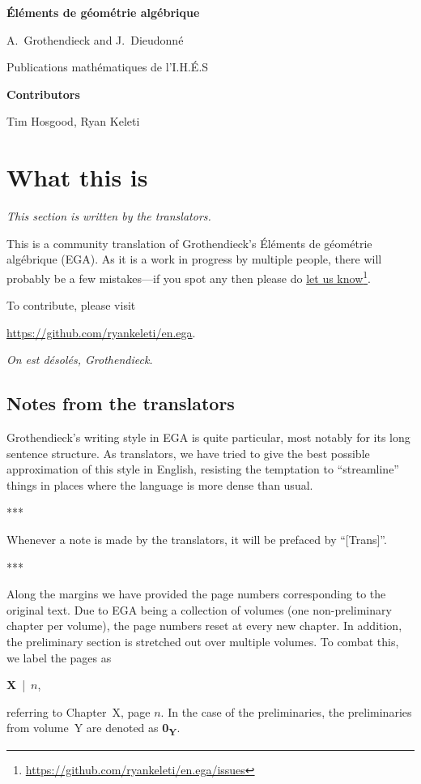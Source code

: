 \documentclass[openany,oneside]{amsbook}
\theoremstyle{ega-env-style}
\theoremstyle{ega-thm-env-style}
\theoremstyle{ega-defn-env-style}
\def\sectionbreak{\begin{center}***\end{center}}
\begin{document}
\begin{titlepage}
\pagestyle{empty}
\setcounter{page}{1}
\centerline{\LARGE\bfseries \'El\'ements de g\'eom\'etrie alg\'ebrique}
\vskip1in
\noindent
\centerline{A.~Grothendieck and J.~Dieudonn\'e}
\centerline{Publications math\'ematiques de l'I.H.\'E.S}
\vskip1in
\noindent
\centerline{\bfseries Contributors}
\centerline{
Tim Hosgood, Ryan Keleti
}
\end{titlepage}
\setcounter{tocdepth}{2}
\tableofcontents

\chapter*{What this is}

\label{section-phantom}

\noindent
\emph{This section is written by the translators.}

\noindent
This is a community translation of Grothendieck's \'El\'ements de g\'eom\'etrie alg\'ebrique (EGA).
As it is a work in progress by multiple people, there will probably be a few mistakes---if you spot any then please do \href{https://github.com/ryankeleti/en.ega/issues}{let us know}\footnote{\url{https://github.com/ryankeleti/en.ega/issues}}.

\noindent
To contribute, please visit
\begin{center}
  \url{https://github.com/ryankeleti/en.ega}.
\end{center}

\noindent
\emph{On est d\'esol\'es, Grothendieck.}

\section*{Notes from the translators}
Grothendieck's writing style in EGA is quite particular, most notably for its long sentence structure.
As translators, we have tried to give the best possible approximation of this style in English, resisting the temptation to ``streamline'' things in places where the language is more dense than usual.

\sectionbreak

Whenever a note is made by the translators, it will be prefaced by ``[Trans]''.

\sectionbreak

Along the margins we have provided the page numbers corresponding to the original text.
Due to EGA being a collection of volumes (one non-preliminary chapter per volume), the page numbers reset at every new chapter.
In addition, the preliminary section is stretched out over multiple volumes.
To combat this, we label the pages as
\begin{center}
  \textbf{X}~|~$n$,
\end{center}
referring to Chapter~X, page $n$.
In the case of the preliminaries, the preliminaries from volume~Y are denoted as \textbf{0\textsubscript{Y}}.
\end{document}
